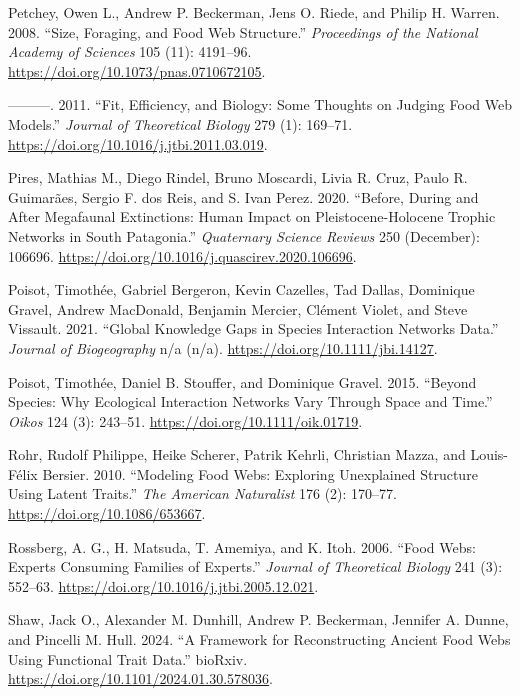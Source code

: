 \documentclass[
  letterpaper,
  DIV=11,
  numbers=noendperiod]{scrartcl}
\newlength{\cslhangindent}
\newenvironment{CSLReferences}[2] %
 {\begin{list}{}{%
  \setlength{\itemindent}{0pt}
  \setlength{\leftmargin}{0pt}
  \setlength{\parsep}{0pt}
  \ifodd #1
   \setlength{\leftmargin}{\cslhangindent}
   \setlength{\itemindent}{-1\cslhangindent}
  \fi
  \setlength{\itemsep}{#2\baselineskip}}}
 {\end{list}}
\begin{document}
\begin{CSLReferences}{1}{0}
Petchey, Owen L., Andrew P. Beckerman, Jens O. Riede, and Philip H.
Warren. 2008. {``Size, Foraging, and Food Web Structure.''}
\emph{Proceedings of the National Academy of Sciences} 105 (11):
4191--96. \url{https://doi.org/10.1073/pnas.0710672105}.

---------. 2011. {``Fit, Efficiency, and Biology: {Some} Thoughts on
Judging Food Web Models.''} \emph{Journal of Theoretical Biology} 279
(1): 169--71. \url{https://doi.org/10.1016/j.jtbi.2011.03.019}.

Pires, Mathias M., Diego Rindel, Bruno Moscardi, Livia R. Cruz, Paulo R.
Guimarães, Sergio F. dos Reis, and S. Ivan Perez. 2020. {``Before,
During and After Megafaunal Extinctions: {Human} Impact on
{Pleistocene-Holocene} Trophic Networks in {South Patagonia}.''}
\emph{Quaternary Science Reviews} 250 (December): 106696.
\url{https://doi.org/10.1016/j.quascirev.2020.106696}.

Poisot, Timothée, Gabriel Bergeron, Kevin Cazelles, Tad Dallas,
Dominique Gravel, Andrew MacDonald, Benjamin Mercier, Clément Violet,
and Steve Vissault. 2021. {``Global Knowledge Gaps in Species
Interaction Networks Data.''} \emph{Journal of Biogeography} n/a (n/a).
\url{https://doi.org/10.1111/jbi.14127}.

Poisot, Timothée, Daniel B. Stouffer, and Dominique Gravel. 2015.
{``Beyond Species: Why Ecological Interaction Networks Vary Through
Space and Time.''} \emph{Oikos} 124 (3): 243--51.
\url{https://doi.org/10.1111/oik.01719}.

Rohr, Rudolf Philippe, Heike Scherer, Patrik Kehrli, Christian Mazza,
and Louis-Félix Bersier. 2010. {``Modeling {Food Webs}: {Exploring
Unexplained Structure Using Latent Traits}.''} \emph{The American
Naturalist} 176 (2): 170--77. \url{https://doi.org/10.1086/653667}.

Rossberg, A. G., H. Matsuda, T. Amemiya, and K. Itoh. 2006. {``Food
Webs: {Experts} Consuming Families of Experts.''} \emph{Journal of
Theoretical Biology} 241 (3): 552--63.
\url{https://doi.org/10.1016/j.jtbi.2005.12.021}.

Shaw, Jack O., Alexander M. Dunhill, Andrew P. Beckerman, Jennifer A.
Dunne, and Pincelli M. Hull. 2024. {``A Framework for Reconstructing
Ancient Food Webs Using Functional Trait Data.''} bioRxiv.
\url{https://doi.org/10.1101/2024.01.30.578036}.


\end{CSLReferences}
\end{document}
